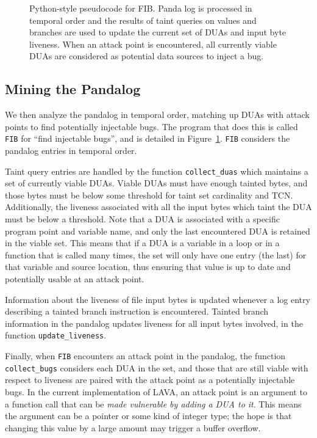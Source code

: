 \begin{figure}

\caption{Python-style pseudocode for FIB. 
Panda log is processed in temporal order and the results of taint queries on values and branches are 
used to update the current set of DUAs and input byte liveness.
When an attack point is encountered, all currently viable DUAs are considered as potential data sources to inject a bug.}
\label{alg:fib}
\end{figure}

\subsection{Mining the Pandalog}
\label{sec:mining}

We then analyze the pandalog in temporal order, matching up DUAs with attack points to find potentially injectable bugs.
The program that does this is called \verb+FIB+ for ``find injectable bugs'', and is detailed in Figure~\ref{alg:fib}.
\verb+FIB+ considers the pandalog entries in temporal order.

Taint query entries are handled by the function \verb+collect_duas+ which maintains a set of currently viable DUAs.
Viable DUAs must have enough tainted bytes, and those bytes must be below some threshold for taint set cardinality and TCN.
Additionally, the liveness associated with all the input bytes which taint the DUA must be below a threshold.
Note that a DUA is associated with a specific program point and variable name, and only the last encountered DUA is retained in the viable set. 
This means that if a DUA is a variable in a loop or in a function that is called many times, the set will only have one entry (the last) for that variable and source location, thus ensuring that value is up to date and potentially usable at an attack point.  

Information about the liveness of file input bytes is updated whenever a log entry describing a tainted branch instruction is encountered.
Tainted branch information in the pandalog updates liveness for all input bytes involved, in the function \verb+update_liveness+.

Finally, when \verb+FIB+ encounters an attack point in the pandalog, the function \verb+collect_bugs+ considers each DUA in the set,
and those that are still viable with respect to liveness are paired with the attack point as a potentially injectable bugs.
In the current implementation of LAVA, an attack point is an argument to a function call that can be \emph{made vulnerable by adding a DUA to it}.
This means the argument can be a pointer or some kind of integer type; the hope is that changing this value by a large amount may trigger a buffer overflow.

